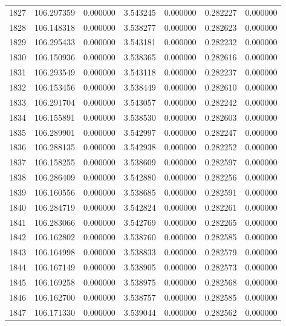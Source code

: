 \begin{tabular}{rrrrrrr}
1827 & 106.297359 &    0.000000 &  3.543245 &   0.000000 &   0.282227 &  0.000000 \\
1828 & 106.148318 &    0.000000 &  3.538277 &   0.000000 &   0.282623 &  0.000000 \\
1829 & 106.295433 &    0.000000 &  3.543181 &   0.000000 &   0.282232 &  0.000000 \\
1830 & 106.150936 &    0.000000 &  3.538365 &   0.000000 &   0.282616 &  0.000000 \\
1831 & 106.293549 &    0.000000 &  3.543118 &   0.000000 &   0.282237 &  0.000000 \\
1832 & 106.153456 &    0.000000 &  3.538449 &   0.000000 &   0.282610 &  0.000000 \\
1833 & 106.291704 &    0.000000 &  3.543057 &   0.000000 &   0.282242 &  0.000000 \\
1834 & 106.155891 &    0.000000 &  3.538530 &   0.000000 &   0.282603 &  0.000000 \\
1835 & 106.289901 &    0.000000 &  3.542997 &   0.000000 &   0.282247 &  0.000000 \\
1836 & 106.288135 &    0.000000 &  3.542938 &   0.000000 &   0.282252 &  0.000000 \\
1837 & 106.158255 &    0.000000 &  3.538609 &   0.000000 &   0.282597 &  0.000000 \\
1838 & 106.286409 &    0.000000 &  3.542880 &   0.000000 &   0.282256 &  0.000000 \\
1839 & 106.160556 &    0.000000 &  3.538685 &   0.000000 &   0.282591 &  0.000000 \\
1840 & 106.284719 &    0.000000 &  3.542824 &   0.000000 &   0.282261 &  0.000000 \\
1841 & 106.283066 &    0.000000 &  3.542769 &   0.000000 &   0.282265 &  0.000000 \\
1842 & 106.162802 &    0.000000 &  3.538760 &   0.000000 &   0.282585 &  0.000000 \\
1843 & 106.164998 &    0.000000 &  3.538833 &   0.000000 &   0.282579 &  0.000000 \\
1844 & 106.167149 &    0.000000 &  3.538905 &   0.000000 &   0.282573 &  0.000000 \\
1845 & 106.169258 &    0.000000 &  3.538975 &   0.000000 &   0.282568 &  0.000000 \\
1846 & 106.162700 &    0.000000 &  3.538757 &   0.000000 &   0.282585 &  0.000000 \\
1847 & 106.171330 &    0.000000 &  3.539044 &   0.000000 &   0.282562 &  0.000000 \\

\end{tabular}
